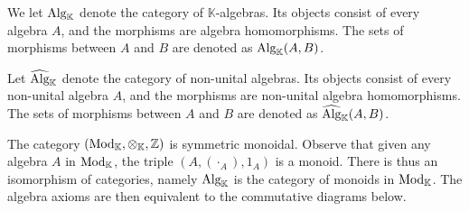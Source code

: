 \documentclass[../thesis.tex]{subfiles}
\begin{document}
            \begin{definition}
                We let $\tt{Alg}_{\mathbb{K}}$ denote the category of $\mathbb{K}$-algebras. Its objects consist of every algebra $A$, and the morphisms are algebra homomorphisms. The sets of morphisms between $A$ and $B$ are denoted as $\tt{Alg}_{\mathbb{K}}(A,B)$.
                
                Let $\widehat{\tt{Alg}}_{\mathbb{K}}$ denote the category of non-unital algebras. Its objects consist of every non-unital algebra $A$, and the morphisms are non-unital algebra homomorphisms. The sets of morphisms between $A$ and $B$ are denoted as $\widehat{\tt{Alg}}_{\mathbb{K}}(A,B)$.
            \end{definition}

            The category $(\tt{Mod}_\mathbb{K},\otimes_\mathbb{K},\mathbb{Z})$ is symmetric monoidal. Observe that given any algebra $A$ in $\tt{Mod}_\mathbb{K}$, the triple $(A,(\cdot_A),1_A)$ is a monoid. There is thus an isomorphism of categories, namely $\tt{Alg}_\mathbb{K}$ is the category of monoids in $\tt{Mod}_\mathbb{K}$. The algebra axioms are then equivalent to the commutative diagrams below.
            \begin{center}
                 \quad
            \end{center}
\end{document}
